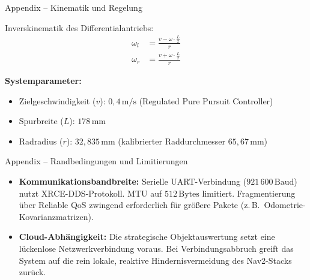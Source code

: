 \documentclass[aspectratio=169]{beamer}
\begin{document}
\begin{frame}{Appendix -- Kinematik und Regelung}

  Inverskinematik des Differentialantriebs:
  \begin{align}
    \omega_l &= \frac{v - \omega \cdot \tfrac{L}{2}}{r} \\[4pt]
    \omega_r &= \frac{v + \omega \cdot \tfrac{L}{2}}{r}
  \end{align}

  \textbf{Systemparameter:}
  \begin{itemize}
    \item Zielgeschwindigkeit ($v$): $0{,}4\,\mathrm{m/s}$
          (Regulated Pure Pursuit Controller)
    \item Spurbreite ($L$): $178\,\mathrm{mm}$
    \item Radradius ($r$): $32{,}835\,\mathrm{mm}$
          (kalibrierter Raddurchmesser $65{,}67\,\mathrm{mm}$)
  \end{itemize}

\end{frame}

\begin{frame}{Appendix -- Randbedingungen und Limitierungen}

  \begin{itemize}
    \item \textbf{Kommunikationsbandbreite:}
          Serielle UART-Verbindung ($921\,600\,\mathrm{Baud}$) nutzt
          XRCE-DDS-Protokoll. MTU auf $512\,\mathrm{Bytes}$ limitiert.
          Fragmentierung über Reliable QoS zwingend erforderlich für
          größere Pakete (z.\,B.\ Odometrie-Kovarianzmatrizen).

    \item \textbf{Cloud-Abhängigkeit:}
          Die strategische Objektauswertung setzt eine lückenlose
          Netzwerkverbindung voraus. Bei Verbindungsabbruch greift das
          System auf die rein lokale, reaktive Hindernisvermeidung des
          Nav2-Stacks zurück.
  \end{itemize}

\end{frame}
\end{document}
